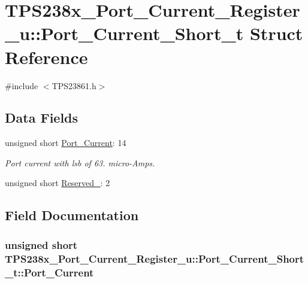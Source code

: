 \hypertarget{struct_t_p_s238x___port___current___register__u_1_1_port___current___short__t}{\section{T\-P\-S238x\-\_\-\-Port\-\_\-\-Current\-\_\-\-Register\-\_\-u\-:\-:Port\-\_\-\-Current\-\_\-\-Short\-\_\-t Struct Reference}
\label{struct_t_p_s238x___port___current___register__u_1_1_port___current___short__t}
}


{\ttfamily \#include $<$T\-P\-S23861.\-h$>$}

\subsection*{Data Fields}
\begin{DoxyCompactItemize}
\item 
unsigned short \hyperlink{struct_t_p_s238x___port___current___register__u_1_1_port___current___short__t_adc42948090c2e27a759b05a7b537aae0}{Port\-\_\-\-Current}\-: 14
\begin{DoxyCompactList}\small\item\em Port current with lsb of 63. micro-\/\-Amps. \end{DoxyCompactList}\item 
unsigned short \hyperlink{struct_t_p_s238x___port___current___register__u_1_1_port___current___short__t_a8b74c71335121601d3fc283721bbecc2}{Reserved\-\_}\-: 2
\end{DoxyCompactItemize}


\subsection{Field Documentation}
\hypertarget{struct_t_p_s238x___port___current___register__u_1_1_port___current___short__t_adc42948090c2e27a759b05a7b537aae0}{
\subsubsection[{Port\-\_\-\-Current}]{\setlength{\rightskip}{0pt plus 5cm}unsigned short T\-P\-S238x\-\_\-\-Port\-\_\-\-Current\-\_\-\-Register\-\_\-u\-::\-Port\-\_\-\-Current\-\_\-\-Short\-\_\-t\-::\-Port\-\_\-\-Current}}\label{struct_t_p_s238x___port___current___register__u_1_1_port___current___short__t_adc42948090c2e27a759b05a7b537aae0}


